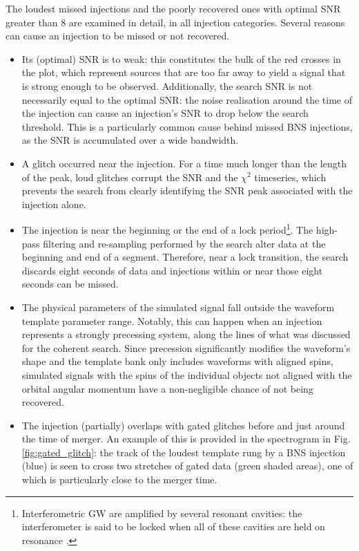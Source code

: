 \documentclass[binding=0.6cm, LaM]{sapthesis}
\begin{document}
	The loudest missed injections and the poorly recovered ones with optimal SNR greater than 8 are
        examined in detail, in all injection categories.
	Several reasons can cause an injection to be missed or not recovered.
       	\begin{itemize}
          \item Its (optimal) SNR is to weak: this constitutes the bulk of the red crosses in the plot, which represent sources that are too far away to yield a signal that is strong enough to be observed.  Additionally, the search SNR is not necessarily equal to the optimal SNR: the noise realisation around the time of the injection can cause an injection's SNR to drop below the search threshold.
            This is a particularly common cause behind missed BNS injections, as the SNR is accumulated over a wide bandwidth.
          \item A glitch occurred near the injection. For a time much longer than the length of the peak, 
            loud glitches corrupt the SNR and the $\chi^2$ timeseries, which prevents the search from clearly identifying the SNR peak associated with the injection alone.
          \item The injection is near the beginning or the end of a lock period\footnote{Interferometric GW are amplified by several resonant cavities: the interferometer is said to be locked when all of these cavities are held on resonance \cite{108}.}. The high-pass filtering and re-sampling performed by the search alter data at the beginning and end of a segment. Therefore, near a lock transition, the search discards eight seconds of data and injections within or near those eight seconds can be missed.
          \item The physical parameters of the simulated signal fall outside the waveform template parameter range.  Notably, this can happen when an injection represents a strongly precessing system, along the lines of what was discussed for the coherent search.  Since precession significantly modifies the waveform's shape and the template bank only includes waveforms with aligned spins, simulated signals with the spins of the individual objects not aligned with the orbital angular momentum have a non-negligible chance of not being recovered.
          \item The injection (partially) overlaps with gated glitches before and just around the time of merger.  An example of this is provided in the spectrogram in Fig.\,\ref{fig:gated_glitch}: the track of the loudest template rung by a BNS injection (blue) is seen to cross two stretches of gated data (green shaded areas), one of which is particularly close to the merger time.

\end{itemize}
\end{document}
